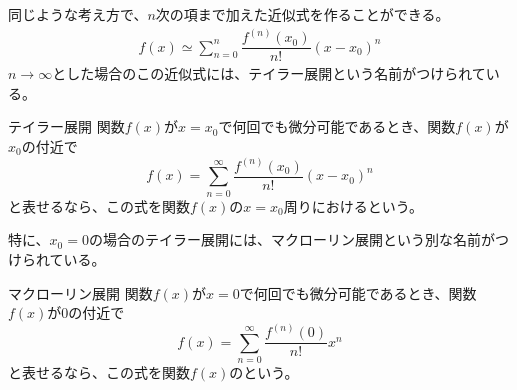 \documentclass[../../../topic_calculus]{subfiles}
\begin{document}
同じような考え方で、$n$次の項まで加えた近似式を作ることができる。
\begin{align}
  f(x) \simeq \sum_{n=0}^{n} \dfrac{f^{(n)}(x_0)}{n!}(x-x_0)^n
\end{align}
$n \to \infty$とした場合のこの近似式には、テイラー展開という名前がつけられている。

\begin{theorem}{テイラー展開}
  関数$f(x)$が$x=x_0$で何回でも微分可能であるとき、関数$f(x)$が$x_0$の付近で
  \begin{equation}
    f(x) = \sum_{n=0}^{\infty} \dfrac{f^{(n)}(x_0)}{n!}(x-x_0)^n
  \end{equation}
  と表せるなら、この式を関数$f(x)$の$x=x_0$周りにおけるという。
\end{theorem}

特に、$x_0 = 0$の場合のテイラー展開には、マクローリン展開という別な名前がつけられている。

\begin{theorem}{マクローリン展開}
  関数$f(x)$が$x=0$で何回でも微分可能であるとき、関数$f(x)$が$0$の付近で
  \begin{equation}
    f(x) = \sum_{n=0}^{\infty} \dfrac{f^{(n)}(0)}{n!}x^n
  \end{equation}
  と表せるなら、この式を関数$f(x)$のという。
\end{theorem}
\end{document}
